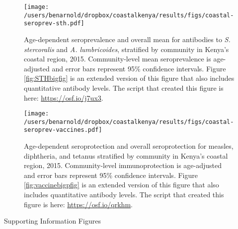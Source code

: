 \documentclass[11pt]{article}
\begin{document}
\begin{figure}[htbp]
\begin{center}
\texttt{[image: /users/benarnold/dropbox/coastalkenya/results/figs/coastal-seroprev-sth.pdf]} 
\begin{minipage}{0.9\textwidth}
\caption{Age-dependent seroprevalence and overall mean for antibodies to \emph{S. stercoralis} and \emph{A. lumbricoides}, stratified by community in Kenya's coastal region, 2015. Community-level mean seroprevalence is age-adjusted and error bars represent 95\% confidence intervals. Figure \ref{fig:STHbigfig} is an extended version of this figure that also includes quantitative antibody levels. The script that created this figure is here: \url{https://osf.io/j7ux3}.}
\label{fig:STHseroprev}
\end{minipage}
\end{center}
\end{figure}



\begin{figure}[htbp]
\begin{center}
\texttt{[image: /users/benarnold/dropbox/coastalkenya/results/figs/coastal-seroprev-vaccines.pdf]} 
\begin{minipage}{0.9\textwidth}
\caption{Age-dependent seroprotection and overall seroprotection for measles, diphtheria, and tetanus stratified by community in Kenya's coastal region, 2015. Community-level immunoprotection is age-adjusted and error bars represent 95\% confidence intervals. Figure \ref{fig:vaccinebigpfig} is an extended version of this figure that also includes quantitative antibody levels. The script that created this figure is here: \url{https://osf.io/qrkhm}.}
\label{fig:vaccineseroprev}
\end{minipage}
\end{center}
\end{figure}




\clearpage
\renewcommand{\thefigure}{S\arabic{figure} }
\setcounter{figure}{0} 
{\LARGE Supporting Information Figures}
\clearpage
\end{document}
